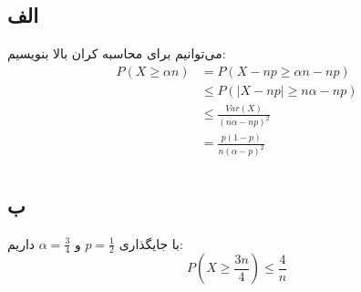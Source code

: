 \subsection*{الف}
می‌توانیم برای محاسبه کران بالا بنویسیم:
\begin{align*}
P(X \ge \alpha n) &= P(X - np \ge \alpha n - np) \\
&\le P(|X - np| \ge n \alpha - np) \\
&\le \frac{Var(X)}{(n\alpha - np)^2} \\
&= \frac{p(1 - p)}{n(\alpha - p)^2} \\
\end{align*}
\subsection*{ب}
با جایگذاری 
$
p = \frac{1}{2}
$
و 
$
\alpha = \frac{3}{4}
$
داریم:
$$
P(X \ge \frac{3n}{4}) \le \frac{4}{n}
$$
